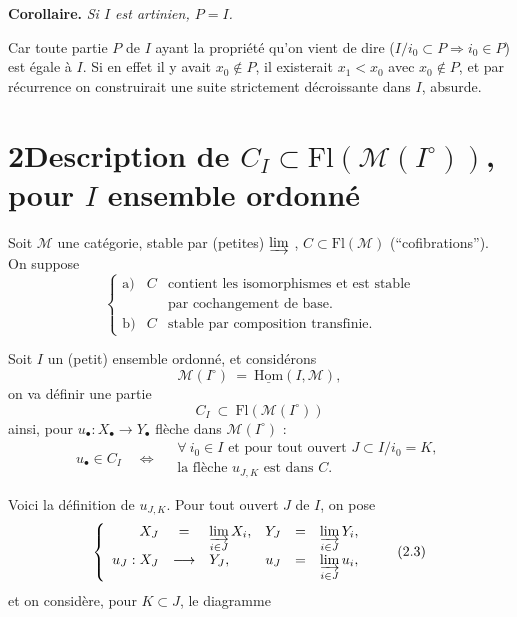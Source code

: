 \documentclass[11pt]{article}
\newcommand{\printedpage}[1]{\marginpar{\footnotesize p.~#1}}
\newcommand{\msp}[1]{\marginpar{\footnotesize [#1]}}
\newcommand{\Fl}{\mathrm{Fl}}
\newcommand{\M}{\mathcal{M}}
\begin{document}
\textbf{Corollaire.} \textit{Si $I$ est artinien, $P = I$.}

Car toute partie $P$ de $I$ ayant la propriété qu'on vient de dire ($I/i_0 \subset P \Longrightarrow i_0 \in P$) est égale à $I$. Si en effet il y avait $x_0 \notin P$, il existerait $x_1 < x_0$ avec $x_0 \notin P$, et par récurrence on construirait une suite strictement décroissante dans $I$, absurde. %

\msp{page 25}

\section*{2\quad Description de $C_I \subset \Fl(\M(I^\circ))$, pour $I$ ensemble ordonné}

Soit $\M$ une catégorie, stable par (petites) $\varinjlim$ , $C \subset \Fl(\M)$ (“cofibrations”). On suppose
\[
\left\{
\begin{array}{lll}
\text{a)} & C & \text{contient les isomorphismes et est stable}\\
 & & \text{par cochangement de base.}\\[1ex]
\text{b)} & C & \text{stable par composition transfinie.}
\end{array}
\right.
\tag*{(2.1)}
\]

Soit $I$ un (petit) ensemble ordonné, et considérons
\[
\M(I^\circ) \ =\ \underline{\mathrm{Hom}}(I,\M),
\]
on va définir une partie
\[
C_I \ \subset\ \Fl(\M(I^\circ))
\]
ainsi, pour $u_\bullet : X_\bullet \longrightarrow Y_\bullet$ flèche dans $\M(I^\circ)$ :
\[
u_\bullet \in C_I \quad\Longleftrightarrow\quad
\begin{array}{l}
\forall\ i_0 \in I \text{ et pour tout ouvert } J \subset I/i_0 = K,\\
\text{la flèche } u_{J,K} \text{ est dans } C.
\end{array}
\tag*{(2.2)}
\]

Voici la définition de $u_{J,K}$. Pour tout ouvert $J$ de $I$, on pose
\[
\left\{
\begin{array}{rclrcl}
X_J & = & \varinjlim\limits_{i\in J} X_i, & Y_J & = & \varinjlim\limits_{i\in J} Y_i,\\[2ex]
u_J : X_J & \longrightarrow & Y_J, & u_J & = & \varinjlim\limits_{i\in J} u_i,
\end{array}
\right.
\tag*{(2.3)}
\]
et on considère, pour $K \subset J$, le diagramme

\printedpage{15}
\end{document}
